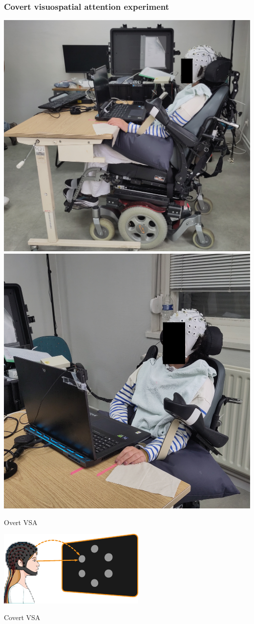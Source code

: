 \documentclass{kul-ulille-beamer}
\begin{document}
\begin{frame}
  \frametitle{Covert visuospatial attention experiment}

  \begin{minipage}{.6\textwidth}
    \includegraphics[height=.45\textwidth]{figures/patients/PD01a-obfuscated.jpg}%
    \hfill%
    \includegraphics[height=.45\textwidth]{figures/patients/PD01b-obfuscated.jpg}%
    \bigskip

    {\small
    \begin{minipage}{.3\textwidth}
      Overt VSA
      \smallskip

      \includegraphics[width=\textwidth]{figures/covert/attention_overt.pdf}
    \end{minipage}\hfill%
    \begin{minipage}{.3\textwidth}
      Covert VSA
      \smallskip


\end{minipage}}
\end{minipage}
\end{frame}
\end{document}
